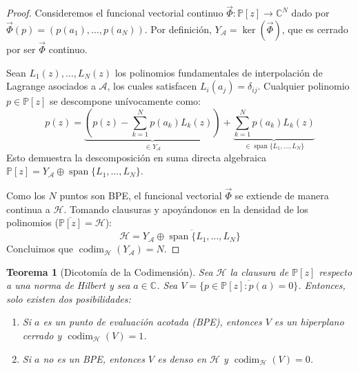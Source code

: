 \documentclass[12pt,a4paper]{article}
\newtheorem{theorem}{Teorema}
\theoremstyle{definition}
\theoremstyle{remark}
\newcommand{\C}{\mathbb{C}}
\newcommand{\Poly}{\mathbb{P}[z]}
\begin{document}
\begin{proof}
	Consideremos el funcional vectorial continuo $\vec{\Phi}: \mathbb{P}[z] \to \mathbb{C}^N$ dado por $\vec{\Phi}(p) = (p(a_1), \dots, p(a_N))$. Por definición, $Y_{\mathcal{A}} = \ker(\vec{\Phi})$, que es cerrado por ser $\vec{\Phi}$ continuo.

	Sean $L_1(z), \dots, L_N(z)$ los polinomios fundamentales de interpolación de Lagrange asociados a $\mathcal{A}$, los cuales satisfacen $L_i(a_j) = \delta_{ij}$. Cualquier polinomio $p \in \mathbb{P}[z]$ se descompone unívocamente como:
	$$p(z) = \underbrace{\left( p(z) - \sum_{k=1}^N p(a_k)L_k(z) \right)}_{\in Y_{\mathcal{A}}} + \underbrace{\sum_{k=1}^N p(a_k)L_k(z)}_{\in \operatorname{span}\{L_1, \dots, L_N\}}$$
	Esto demuestra la descomposición en suma directa algebraica $\mathbb{P}[z] = Y_{\mathcal{A}} \oplus \operatorname{span}\{L_1, \dots, L_N\}$.

	Como los $N$ puntos son BPE, el funcional vectorial $\vec{\Phi}$ se extiende de manera continua a $\mathcal{H}$. Tomando clausuras y apoyándonos en la densidad de los polinomios ($\overline{\mathbb{P}[z]} = \mathcal{H}$):
	$$\mathcal{H} = \overline{Y_{\mathcal{A}} \oplus \operatorname{span}\{L_1, \dots, L_N\}}$$
	Concluimos que $\operatorname{codim}_{\mathcal{H}}(Y_{\mathcal{A}}) = N$.
\end{proof}

\begin{theorem}[Dicotomía de la Codimensión]
	\label{thm:dicotomia}
	Sea $\mathcal{H}$ la clausura de $\Poly$ respecto a una norma de Hilbert y sea $a \in \C$. Sea $V = \overline{\{p \in \Poly : p(a)=0\}}$. Entonces, solo existen dos posibilidades:
	\begin{enumerate}
		\item Si $a$ es un punto de evaluación acotada (BPE), entonces $V$ es un hiperplano cerrado y $\operatorname{codim}_{\mathcal{H}}(V) = 1$.
		\item Si $a$ no es un BPE, entonces $V$ es denso en $\mathcal{H}$ y $\operatorname{codim}_{\mathcal{H}}(V) = 0$.
	\end{enumerate}
\end{theorem}
\end{document}

